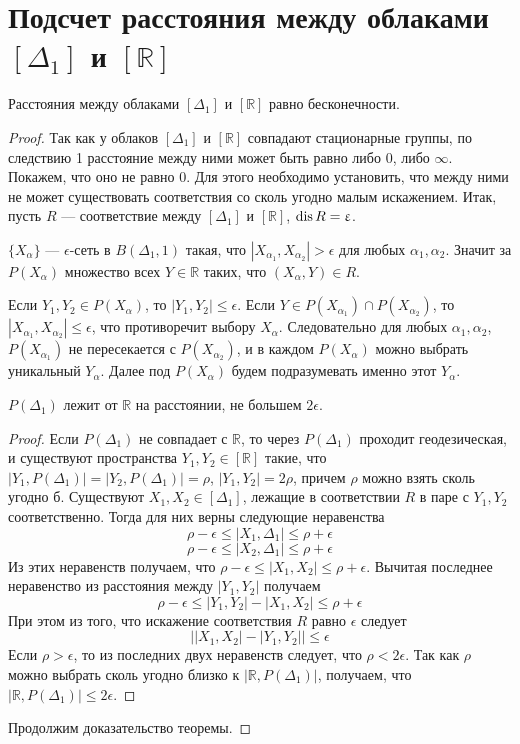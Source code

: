 
\section{Подсчет расстояния между облаками $[\Delta_1]$ и $[\mathbb{R}]$}
\begin{theorem}
	Расстояния между облаками $[\Delta_1]$ и $[\mathbb{R}]$ равно бесконечности.
\end{theorem} 

\begin{proof}
	Так как у облаков $[\Delta_1]$ и $[\mathbb{R}]$ совпадают стационарные группы, по следствию 1 расстояние между ними может быть равно либо $0$, либо $\infty$. Покажем, что оно не равно $0$. Для этого необходимо установить, что между ними не может существовать соответствия со сколь угодно малым искажением. Итак, пусть $R$ --- соответствие между $[\Delta_1]$ и $[\mathbb{R}]$, $\operatorname{dis} R = \upvarepsilon$.
	
	$\{X_\alpha\}$ --- $\epsilon$-сеть в $B(\Delta_1,1)$ такая, что $|X_{\alpha_1}, X_{\alpha_2}| > \epsilon$ для любых $\alpha_1, \alpha_2$. Значит за $P(X_\alpha)$ множество всех $Y\in \mathbb{R}$ таких, что $(X_\alpha, Y)\in R$.
	
	Если $Y_1, Y_2 \in P(X_\alpha)$, то $|Y_1, Y_2| \le \epsilon$. Если $Y \in P(X_{\alpha_1}) \cap P(X_{\alpha_2})$, то $|X_{\alpha_1}, X_{\alpha_2}| \le \epsilon$, что противоречит выбору $X_\alpha$. Следовательно для любых $\alpha_1, \alpha_2$, $P(X_{\alpha_1})$ не пересекается с $P(X_{\alpha_2})$, и в каждом $P(X_\alpha)$ можно выбрать уникальный $Y_\alpha$. Далее под $P(X_\alpha)$ будем подразумевать именно этот $Y_\alpha$.
	\begin{lemma}
		$P(\Delta_1)$ лежит от $\mathbb{R}$ на расстоянии, не большем $2\epsilon$.
	\end{lemma}
	\begin{proof}
		Если $P(\Delta_1)$ не совпадает с $\mathbb{R}$, то через $P(\Delta_1)$ проходит геодезическая, и существуют пространства $Y_1, Y_2 \in [\mathbb{R}]$ такие, что $|Y_1,P(\Delta_1)| = |Y_2,P(\Delta_1)| = \rho$, $|Y_1,Y_2| = 2\rho$, причем $\rho$ можно взять сколь угодно б. Существуют $X_1, X_2\in [\Delta_1]$, лежащие в соответствии $R$ в паре с $Y_1, Y_2$ соответственно. Тогда для них верны следующие неравенства 
		$$\rho - \epsilon \le |X_1, \Delta_1| \le \rho + \epsilon$$
		$$\rho - \epsilon \le |X_2, \Delta_1| \le \rho + \epsilon$$
		Из этих неравенств получаем, что $\rho - \epsilon \le |X_1, X_2| \le \rho + \epsilon$. Вычитая последнее неравенство из расстояния между $|Y_1, Y_2|$ получаем $$\rho - \epsilon \le |Y_1,Y_2| - |X_1,X_2|\le \rho + \epsilon$$
		При этом из того, что искажение соответствия $R$ равно $\epsilon$ следует
		$$\big||X_1,X_2| - |Y_1, Y_2|\big| \le \epsilon$$ 
		Если $\rho > \epsilon$, то из последних двух неравенств следует, что $\rho < 2\epsilon$. Так как $\rho$ можно выбрать сколь угодно близко к $|\mathbb{R}, P(\Delta_1)|$, получаем, что $|\mathbb{R}, P(\Delta_1)| \le 2\epsilon$.
	\end{proof}
	Продолжим доказательство теоремы.
	

\end{proof}

